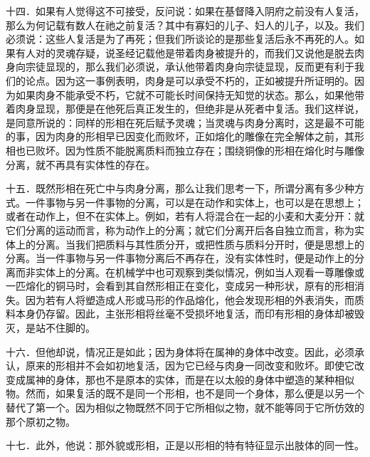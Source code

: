 十四．如果有人觉得这不可接受，反问说：如果在基督降入阴府之前没有人复活，那么为何记载有数人在祂之前复活？其中有寡妇的儿子、妇人的儿子，以及。我们必须说：这些人复活是为了再死；但我们所谈论的是那些复活后永不再死的人。如果有人对的灵魂存疑，说圣经记载他是带着肉身被提升的，而我们又说他是脱去肉身向宗徒显现的，那么我们必须说，承认他带着肉身向宗徒显现，反而更有利于我们的论点。因为这一事例表明，肉身是可以承受不朽的，正如被提升所证明的。因为如果肉身不能承受不朽，它就不可能长时间保持无知觉的状态。那么，如果他带着肉身显现，那便是在他死后真正发生的，但绝非是从死者中复活。我们这样说，是同意所说的：同样的形相在死后赋予灵魂；当灵魂与肉身分离时，这是最不可能的事，因为肉身的形相早已因变化而败坏，正如熔化的雕像在完全解体之前，其形相也已败坏。因为性质不能脱离质料而独立存在；围绕铜像的形相在熔化时与雕像分离，就不再具有实体性的存在。\par

十五．既然形相在死亡中与肉身分离，那么让我们思考一下，所谓分离有多少种方式。一件事物与另一件事物的分离，可以是在动作和实体上，也可以是在思想上；或者在动作上，但不在实体上。例如，若有人将混合在一起的小麦和大麦分开：就它们分离的运动而言，称为动作上的分离；就它们分离开后各自独立而言，称为实体上的分离。当我们把质料与其性质分开，或把性质与质料分开时，便是思想上的分离。当一件事物与另一件事物分离后不再存在，没有实体性时，便是动作上的分离而非实体上的分离。在机械学中也可观察到类似情况，例如当人观看一尊雕像或一匹熔化的铜马时，会看到其自然形相正在变化，变成另一种形状，原有的形相消失。因为若有人将塑造成人形或马形的作品熔化，他会发现形相的外表消失，而质料本身仍存留。因此，主张形相将丝毫不受损坏地复活，而印有形相的身体却被毁灭，是站不住脚的。\par

十六．但他却说，情况正是如此；因为身体将在属神的身体中改变。因此，必须承认，原来的形相并不会如初地复活，因为它已经与肉身一同改变和败坏。即使它改变成属神的身体，那也不是原本的实体，而是在以太般的身体中塑造的某种相似物。然而，如果复活的既不是同一个形相，也不是同一个身体，那么便是以另一个替代了第一个。因为相似之物既然不同于它所相似之物，就不能等同于它所仿效的那个原初之物。\par

十七．此外，他说：那外貌或形相，正是以形相的特有特征显示出肢体的同一性。\par

